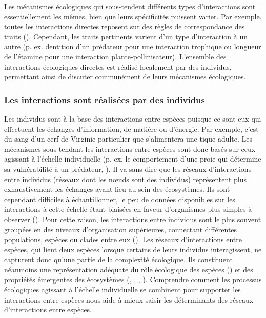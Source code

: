 Les mécanismes écologiques qui sous-tendent différents types d'interactions sont
essentiellement les mêmes, bien que leurs spécificités puissent varier. Par
exemple, toutes les interactions directes reposent sur des règles de
correspondance des traits (\cite{Poisot2015Species}). Cependant, les traits
pertinents varient d'un type d'interaction à un autre (p. ex. dentition d'un
prédateur pour une interaction trophique ou longueur de l'étamine pour une
interaction plante-pollinisateur). L'ensemble des interactions écologiques
directes est réalisé localement par des individus, permettant ainsi de discuter
communément de leurs mécanismes écologiques.

\subsubsection{Les interactions sont réalisées par des individus} 

Les individus sont à la base des interactions entre espèces puisque ce sont eux
qui effectuent les échanges d'information, de matière ou d'énergie. Par exemple,
c'est du sang d'un cerf de Virginie particulier que s'alimentera une tique
adulte. Les mécanismes sous-tendant les interactions entre espèces sont donc
basés sur ceux agissant à l'échelle individuelle (p. ex. le comportement d'une
proie qui détermine sa vulnérabilité à un prédateur,
\cite{Choh2012Predatorprey}). Il va sans dire que les réseaux d'interactions
entre individus (réseaux dont les nœuds sont des individus) représentent plus
exhaustivement les échanges ayant lieu au sein des écosystèmes. Ils sont
cependant difficiles à échantillonner, le peu de données disponibles sur les
interactions à cette échelle étant biaisées en faveur d'organismes plus simples
à observer (\cite{Guimaraes2020Structure}). Pour cette raison, les interactions
entre individus sont le plus souvent groupées en des niveaux d'organisation
supérieures, connectant différentes populations, espèces ou clades entre eux
(\cite{Elton1927Animal}). Les réseaux d'interactions entre espèces, qui lient
deux espèces lorsque certains de leurs individus interagissent, ne capturent
donc qu'une partie de la complexité écologique. Ils constituent néanmoins une
représentation adéquate du rôle écologique des espèces
(\cite{Delmas2019Analysing}) et des propriétés émergentes des écosystèmes
(\cite{Loreau2010Populations}, \cite{McCann2011Food},
\cite{Bascompte2013Mutualistic}, \cite{Gonzalez2020Scalingup}). Comprendre
comment les processus écologiques agissant à l'échelle individuelle se combinent
pour supporter les interactions entre espèces nous aide à mieux saisir les
déterminants des réseaux d'interactions entre espèces.

